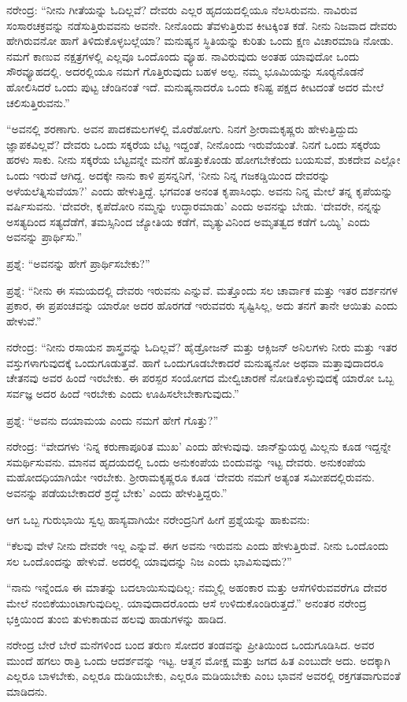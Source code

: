 ನರೇಂದ್ರ: “ನೀನು ಗೀತೆಯನ್ನು ಓದಿಲ್ಲವೆ? ದೇವರು ಎಲ್ಲರ ಹೃದಯದಲ್ಲಿಯೂ ನೆಲಸಿರುವನು. ನಾವಿರುವ ಸಂಸಾರಚಕ್ರವನ್ನು ನಡೆಸುತ್ತಿರುವವನು ಅವನೇ. ನೀನೊಂದು ತೆವಳುತ್ತಿರುವ ಕೀಟಕ್ಕಿಂತ ಕಡೆ. ನೀನು ನಿಜವಾದ ದೇವರು ಹೇಗಿರುವನೋ ಹಾಗೆ ತಿಳಿದುಕೊಳ್ಳಬಲ್ಲೆಯಾ? ಮನುಷ್ಯನ ಸ್ಥಿತಿಯನ್ನು ಕುರಿತು ಒಂದು ಕ್ಷಣ ವಿಚಾರಮಾಡಿ ನೋಡು. ನಮಗೆ ಕಾಣುವ ನಕ್ಷತ್ರಗಳಲ್ಲಿ ಎಲ್ಲವೂ ಒಂದೊಂದು ವ್ಯೂಹ. ನಾವಿರುವುದು ಅಂತಹ ಯಾವುದೋ ಒಂದು ಸೌರವ್ಯೂಹದಲ್ಲಿ. ಅದರಲ್ಲಿಯೂ ನಮಗೆ ಗೊತ್ತಿರುವುದು ಬಹಳ ಅಲ್ಪ. ನಮ್ಮ ಭೂಮಿಯನ್ನು ಸೂರ‍್ಯನೊಡನೆ ಹೋಲಿಸಿದರೆ ಒಂದು ಪುಟ್ಟ ಚೆಂಡಿನಂತೆ ಇದೆ. ಮನುಷ್ಯನಾದರೊ ಒಂದು ಕನಿಷ್ಟ ಪಕ್ಷದ ಕೀಟದಂತೆ ಅದರ ಮೇಲೆ ಚಲಿಸುತ್ತಿರುವನು.”

“ಅವನಲ್ಲಿ ಶರಣಾಗು. ಅವನ ಪಾದಕಮಲಗಳಲ್ಲಿ ಮೊರೆಹೋಗು. ನಿನಗೆ ಶ‍್ರೀರಾಮಕೃಷ್ಣರು ಹೇಳುತ್ತಿದ್ದುದು ಜ್ಞಾಪಕವಿಲ್ಲವೆ? ದೇವರು ಒಂದು ಸಕ್ಕರೆಯ ಬೆಟ್ಟ ಇದ್ದಂತೆ, ನೀನೊಂದು ಇರುವೆಯಂತೆ. ನಿನಗೆ ಒಂದು ಸಕ್ಕರೆಯ ಹರಳು ಸಾಕು. ನೀನು ಸಕ್ಕರೆಯ ಬೆಟ್ಟವನ್ನೇ ಮನೆಗೆ ಹೊತ್ತುಕೊಂಡು ಹೋಗಬೇಕೆಂದು ಬಯಸುವೆ, ಶುಕದೇವ ಎಲ್ಲೋ ಒಂದು ಇರುವೆ ಆಗಿದ್ದ. ಅದಕ್ಕೇ ನಾನು ಕಾಳಿ ಪ್ರಸನ್ನನಿಗೆ, ‘ನೀನು ನಿನ್ನ ಗಜಕಡ್ಡಿಯಿಂದ ದೇವರನ್ನು ಅಳೆಯಲೆತ್ನಿಸುವೆಯಾ?’ ಎಂದು ಹೇಳುತ್ತಿದ್ದೆ. ಭಗವಂತ ಅನಂತ ಕೃಪಾಸಿಂಧು. ಅವನು ನಿನ್ನ ಮೇಲೆ ತನ್ನ ಕೃಪೆಯನ್ನು ವರ್ಷಿಸುವನು. ‘ದೇವರೇ, ಕೃಪೆದೋರಿ ನಮ್ಮನ್ನು ಉದ್ಧಾರಮಾಡು’ ಎಂದು ಅವನನ್ನು ಬೇಡು. ‘ದೇವರೇ, ನನ್ನನ್ನು ಅಸತ್ಯದಿಂದ ಸತ್ಯದೆಡೆಗೆ, ತಮಸ್ಸಿನಿಂದ ಜ್ಯೋತಿಯ ಕಡೆಗೆ, ಮೃತ್ಯುವಿನಿಂದ ಅಮೃತತ್ವದ ಕಡೆಗೆ ಒಯ್ಯಿ’ ಎಂದು ಅವನನ್ನು ಪ್ರಾರ್ಥಿಸು.”

ಪ್ರಶ್ನೆ: “ಅವನನ್ನು ಹೇಗೆ ಪ್ರಾರ್ಥಿಸಬೇಕು?”

ಪ್ರಶ್ನೆ: “ನೀನು ಈ ಸಮಯದಲ್ಲಿ ದೇವರು ಇರುವನು ಎನ್ನುವೆ. ಮತ್ತೊಂದು ಸಲ ಚಾರ್ವಾಕ ಮತ್ತು ಇತರ ದರ್ಶನಗಳ ಪ್ರಕಾರ, ಈ ಪ್ರಪಂಚವನ್ನು ಯಾರೋ ಅದರ ಹೊರಗಡೆ ಇರುವವರು ಸೃಷ್ಟಿಸಿಲ್ಲ, ಅದು ತನಗೆ ತಾನೇ ಆಯಿತು ಎಂದು ಹೇಳುವೆ.”

ನರೇಂದ್ರ: “ನೀನು ರಸಾಯನ ಶಾಸ್ತ್ರವನ್ನು ಓದಿಲ್ಲವೆ? ಹೈಡ್ರೋಜನ್ ಮತ್ತು ಆಕ್ಸಿಜನ್ ಅನಿಲಗಳು ನೀರು ಮತ್ತು ಇತರ ವಸ್ತುಗಳಾಗುವುದಕ್ಕೆ ಒಂದುಗೂಡುತ್ತವೆ. ಹಾಗೆ ಒಂದುಗೂಡಬೇಕಾದರೆ ಮನುಷ್ಯನೋ ಅಥವಾ ಮತ್ತಾವುದಾದರೂ ಚೇತನವು ಅವರ ಹಿಂದೆ ಇರಬೇಕು. ಈ ಪರಸ್ಪರ ಸಂಯೋಗದ ಮೇಲ್ವಿಚಾರಣೆ ನೋಡಿಕೊಳ್ಳುವುದಕ್ಕೆ ಯಾರೋ ಒಬ್ಬ ಸರ್ವಜ್ಞ ಅದರ ಹಿಂದೆ ಇರಬೇಕು ಎಂದು ಊಹಿಸಲೇಬೇಕಾಗುವುದು.”

ಪ್ರಶ್ನೆ: “ಅವನು ದಯಾಮಯ ಎಂದು ನಮಗೆ ಹೇಗೆ ಗೊತ್ತು?”

ನರೇಂದ್ರ: “ವೇದಗಳು ‘ನಿನ್ನ ಕರುಣಾಪೂರಿತ ಮುಖ’ ಎಂದು ಹೇಳುವುವು. ಜಾನ್‍ಸ್ಟುಯರ‍್ಟ ಮಿಲ್ಲನು ಕೂಡ ಇದ್ದನ್ನೇ ಸಮರ್ಥಿಸುವನು. ಮಾನವ ಹೃದಯದಲ್ಲಿ ಒಂದು ಅನುಕಂಪೆಯ ಬಿಂದುವನ್ನು ಇಟ್ಟ ದೇವರು. ಅನುಕಂಪೆಯ ಮಹೋದಧಿಯಾಗಿಯೇ ಇರಬೇಕು. ಶ‍್ರೀರಾಮಕೃಷ್ಣರೂ ಕೂಡ ‘ದೇವರು ನಮಗೆ ಅತ್ಯಂತ ಸಮೀಪದಲ್ಲಿರುವನು. ಅವನನ್ನು ಪಡೆಯಬೇಕಾದರೆ ಶ್ರದ್ಧೆ ಬೇಕು’ ಎಂದು ಹೇಳುತ್ತಿದ್ದರು.”

ಆಗ ಒಬ್ಬ ಗುರುಭಾಯಿ ಸ್ವಲ್ಪ ಹಾಸ್ಯವಾಗಿಯೇ ನರೇಂದ್ರನಿಗೆ ಹೀಗೆ ಪ್ರಶ್ನೆಯನ್ನು ಹಾಕುವನು:

“ಕೆಲವು ವೇಳೆ ನೀನು ದೇವರೇ ಇಲ್ಲ ಎನ್ನುವೆ. ಈಗ ಅವನು ಇರುವನು ಎಂದು ಹೇಳುತ್ತಿರುವೆ. ನೀನು ಒಂದೊಂದು ಸಲ ಒಂದೊಂದನ್ನು ಹೇಳುವೆ. ಅದರಲ್ಲಿ ಯಾವುದನ್ನು ನಿಜ ಎಂದು ಭಾವಿಸುವುದು?”

“ನಾನು ಇನ್ನೆಂದೂ ಈ ಮಾತನ್ನು ಬದಲಾಯಿಸುವುದಿಲ್ಲ: ನಮ್ಮಲ್ಲಿ ಅಹಂಕಾರ ಮತ್ತು ಆಸೆಗಳಿರುವವರೆಗೂ ದೇವರ ಮೇಲೆ ನಂಬಿಕೆಯುಂಟಾಗುವುದಿಲ್ಲ. ಯಾವುದಾದರೊಂದು ಆಸೆ ಉಳಿದುಕೊಂಡಿರುತ್ತದೆ.” ಅನಂತರ ನರೇಂದ್ರ ಭಕ್ತಿಯಿಂದ ತುಂಬಿ ತುಳುಕಾಡುವ ಹಲವು ಹಾಡುಗಳನ್ನು ಹಾಡಿದ.

ನರೇಂದ್ರ ಬೇರೆ ಬೇರೆ ಮನೆಗಳಿಂದ ಬಂದ ತರುಣ ಸೋದರ ತಂಡವನ್ನು ಪ್ರೀತಿಯಿಂದ ಒಂದುಗೂಡಿಸಿದ. ಅವರ ಮುಂದೆ ಹಗಲು ರಾತ್ರಿ ಒಂದು ಆದರ್ಶವನ್ನು ಇಟ್ಟ. ಆತ್ಮನ ಮೋಕ್ಷ ಮತ್ತು ಜಗದ ಹಿತ ಎಂಬುದೇ ಅದು. ಅದಕ್ಕಾಗಿ ಎಲ್ಲರೂ ಬಾಳಬೇಕು, ಎಲ್ಲರೂ ದುಡಿಯಬೇಕು, ಎಲ್ಲರೂ ಮಡಿಯಬೇಕು ಎಂಬ ಭಾವನೆ ಅವರಲ್ಲಿ ರಕ್ತಗತವಾಗುವಂತೆ ಮಾಡಿದನು.

